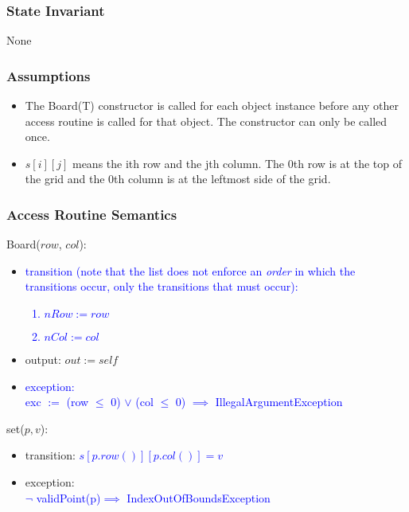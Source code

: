 \documentclass[12pt]{article}
\begin{document}
\subsubsection* {State Invariant}

None

\subsubsection* {Assumptions}

\begin{itemize}
\item The Board(T) constructor is called for each object instance before any
other access routine is called for that object.  The constructor can only be
called once.
\item $s[i][j]$ means the ith row and the jth column.  The 0th row is at the top of the grid and the 0th column is at the leftmost side of the grid.
\end{itemize}

\subsubsection* {Access Routine Semantics}

Board($row$, $col$):
\begin{itemize}
\item \textcolor{blue}{transition (note that the list does not enforce an \emph{order} in which the transitions occur, only the transitions that must occur): \begin{enumerate} \item $nRow := row$ \item $nCol := col$\end{enumerate}}

\item output: $\mathit{out} := \mathit{self}$
\item \textcolor{blue}{exception: \\
exc $:=$ (row $\leq$ 0) $\lor$ (col $\leq$ 0) $\implies$ IllegalArgumentException}
\end{itemize}

\noindent set($p, v$):
\begin{itemize}
\item transition: \textcolor{blue}{$s[p.row()][p.col()] = v$}
\item exception:\\ \textcolor{blue}{$\lnot$ validPoint(p)$\implies$ IndexOutOfBoundsException}
\end{itemize}
\end{document}
